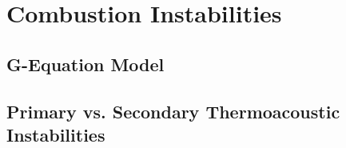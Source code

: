 \section{Combustion Instabilities}


\subsection{G-Equation Model}




\subsection{Primary vs. Secondary Thermoacoustic Instabilities}








